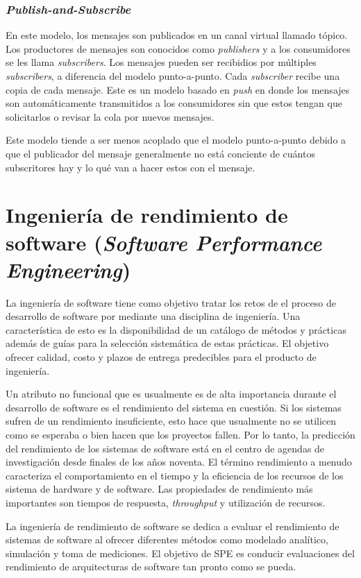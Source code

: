 \documentclass[11pt, twoside]{report}
\begin{document}
\subsubsection{\emph{Publish-and-Subscribe}}
En este modelo, los mensajes son publicados en un canal virtual llamado tópico. Los productores de mensajes son conocidos como \emph{publishers} y a los consumidores se les llama \emph{subscribers}. Los mensajes pueden ser recibidios por múltiples \emph{subscribers}, a diferencia del modelo punto-a-punto. Cada \emph{subscriber} recibe una copia de cada mensaje. Este es un modelo basado en \emph{push} en donde los mensajes son automáticamente transmitidos a los consumidores sin que estos tengan que solicitarlos o revisar la cola por nuevos mensajes. 

Este modelo tiende a ser menos acoplado que el modelo punto-a-punto debido a que el publicador del mensaje generalmente no está conciente de cuántos subscritores hay y lo qué van a hacer estos con el mensaje.

\section{Ingeniería de rendimiento de software (\emph{Software Performance Engineering})}
La ingeniería de software tiene como objetivo tratar los retos de el proceso de desarrollo de software por mediante una disciplina de ingeniería. Una característica de esto es la disponibilidad de un catálogo de métodos y prácticas además de guías para la selección sistemática de estas prácticas. El objetivo ofrecer calidad, costo y plazos de entrega predecibles para el producto de ingeniería.

Un atributo no funcional que es usualmente es de alta importancia durante el desarrollo de software es el rendimiento del sistema en cuestión. Si los sistemas sufren de un rendimiento insuficiente, esto hace que usualmente no se utilicen como se esperaba o bien hacen que los proyectos fallen. Por lo tanto, la predicción del rendimiento de los sistemas de software está en el centro de agendas de investigación desde finales de los años noventa\cite{huber-et-al}. El término rendimiento a menudo  caracteriza el comportamiento en el tiempo y la eficiencia de los recursos de los sistema de hardware y de software. Las propiedades de rendimiento más importantes son tiempos de respuesta, \emph{throughput} y utilización de recursos.

La ingeniería de rendimiento de software se dedica a evaluar el rendimiento de sistemas de software al ofrecer diferentes métodos como modelado analítico, simulación y toma de mediciones. El objetivo de SPE es conducir evaluaciones del rendimiento de arquitecturas de software tan pronto como se pueda. 
\end{document}
